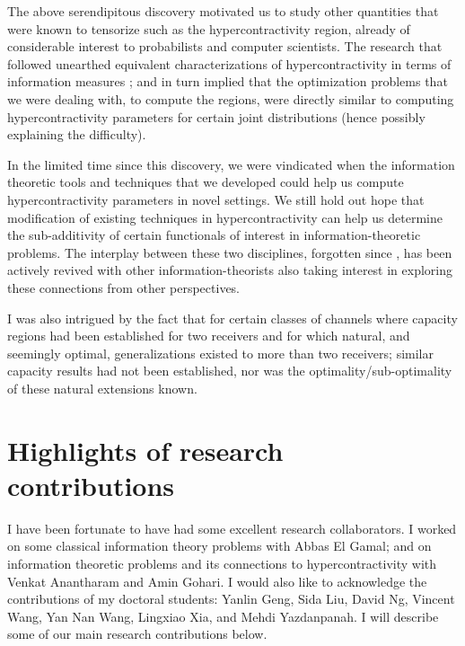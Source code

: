 \documentclass[11pt]{paper} %
\begin{document}
 The above serendipitous discovery motivated us to study other quantities that were known to tensorize such as the hypercontractivity region, already of considerable interest to probabilists and computer scientists. The research that followed unearthed equivalent characterizations of hypercontractivity in terms of information measures \cite{agkn14,nai14b}; and in turn implied that the optimization problems that we were dealing with, to compute the regions, were directly similar to computing hypercontractivity parameters for certain joint distributions  (hence possibly explaining the difficulty).
 
  In the limited time since this discovery, we were vindicated when the information theoretic tools and techniques that we developed could help us compute hypercontractivity parameters in novel settings\cite{naw16,naw17}. We still hold out hope that modification of existing techniques in hypercontractivity can help us determine the sub-additivity of certain functionals of interest in information-theoretic problems. The interplay between these two disciplines, forgotten since \cite{ahg76}, has been actively revived with other information-theorists also taking  interest in exploring these connections from other perspectives.

I was also intrigued by the fact that for certain classes of channels where capacity regions had been established for two receivers and for which  natural, and seemingly optimal, generalizations existed to more than two receivers; similar capacity results had not been established, nor was the optimality/sub-optimality of these natural extensions known. 







\section*{Highlights of research contributions}

I have been fortunate to have had some excellent research collaborators.  I worked on some classical information theory problems with Abbas El Gamal; and on information theoretic problems and its connections to hypercontractivity with Venkat Anantharam and Amin Gohari. I would also like to acknowledge the contributions of my doctoral students: Yanlin Geng, Sida Liu, David Ng, Vincent Wang,  Yan Nan Wang, Lingxiao Xia, and Mehdi Yazdanpanah. I will describe some of our main research contributions below.
\end{document}
